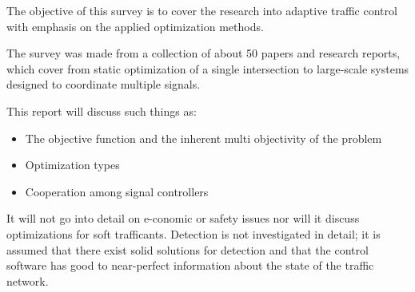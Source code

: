 The objective of this survey is to cover the research into adaptive traffic control with emphasis on the applied optimization methods.

The survey was made from a collection of about 50 papers and research reports, which cover from static optimization of a single intersection to large-scale systems designed to coordinate multiple signals.

This report will discuss such things as:

\begin{itemize}
\item The objective function and the inherent multi objectivity of the problem
\item Optimization types
\item Cooperation among signal controllers
\end{itemize}

It will not go into detail on e-conomic or safety issues nor will it discuss optimizations for soft trafficants. Detection is not investigated in detail; it is assumed that there exist solid solutions for detection and that the control software has good to near-perfect information about the state of the traffic network.
